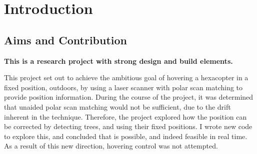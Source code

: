\documentclass[12pt,oneside,a4paper]{book}
\begin{document}
\cleardoublepage
\pagestyle{headings}
\tableofcontents


\cleardoublepage
\pagestyle{headings}
\glsaddall
\printglossaries
\mainmatter

\part{Introduction}
\chapter{Aims and Contribution}
\label{cha:aims}


\textbf{This is a research project with strong design and build elements.}

This project set out to achieve the ambitious goal of hovering a
hexacopter in a fixed position, outdoors, by using a laser scanner with
polar scan matching to provide position information. During the course
of the project, it was determined that unaided polar scan matching
would not be sufficient, due to the drift inherent in the
technique. Therefore, the project explored how the position can be
corrected by detecting trees, and using their fixed positions. I wrote
new code to explore this, and concluded that is possible, and indeed
feasible in real time. As a result of this new direction, hovering
control was not attempted.
\end{document}
